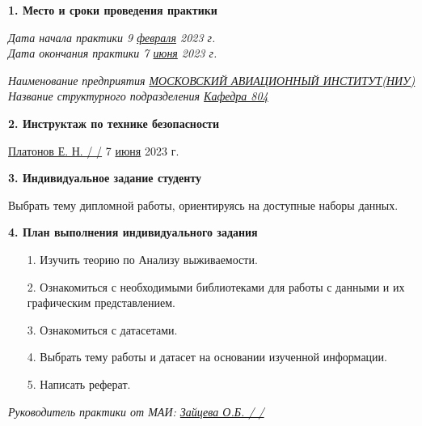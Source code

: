 \textbf{1. Место и сроки проведения практики}

\vspace{20pt}

{\em Дата начала практики \hspace{3cm} 9 \underline{февраля} 2023 г.} \\

{\em Дата окончания практики \hspace{3cm} 7 \underline{июня} 2023 г.}

\vspace{20pt}

{\em Наименование предприятия \underline{МОСКОВСКИЙ АВИАЦИОННЫЙ ИНСТИТУТ(НИУ)}} \\

{\em Название структурного подразделения \underline{Кафедра 804}}

\vspace{20pt}

\textbf{2. Инструктаж по технике безопасности}

\vspace{10pt}

\underline{ Платонов Е. Н. / \hspace{3cm} /} \hspace{1cm} 7 \underline{июня} 2023 г.

\vspace{10pt}

\textbf{3. Индивидуальное задание студенту}

Выбрать тему дипломной работы, ориентируясь на доступные наборы данных.

\vspace{10pt}
\pagebreak

\textbf{4. План выполнения индивидуального задания}

\begin{itemize}
    \item[1.] Изучить теорию по Анализу выживаемости.
    \item[2.] Ознакомиться с необходимыми библиотеками для работы с данными и их графическим представлением.
    \item[3.] Ознакомиться с датасетами.
    \item[4.] Выбрать тему работы и датасет на основании изученной информации.
    \item[5.] Написать реферат.
\end{itemize}

{\em Руководитель практики от МАИ: \underline{Зайцева О.Б. / \hspace{3cm} /}}

